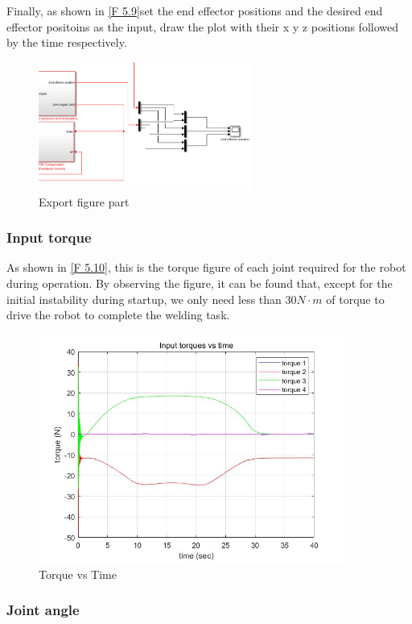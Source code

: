 Finally, as shown in \autoref{F 5.9}set the end effector positions and the desired end effector positoins as the input, draw the plot with their x y z positions followed by the time respectively.

\begin{figure}[htbp]
	\centering
	\includegraphics[width=7cm]{./fig/re.png}
	\caption{Export figure part}
	\label{F 5.9}
\end{figure}


\subsubsection*{Input torque}


As shown in \autoref{F 5.10}, this is the torque figure of each joint required for the robot during operation. By observing the figure, it can be found that, except for the initial instability during startup, we only need less than $30N\cdot m$ of torque to drive the robot to complete the welding task.

\begin{figure}[htbp]
	\centering
	\includegraphics[width=10cm]{./fig/3.jpg}
	\caption{Torque vs Time}
	\label{F 5.10}
\end{figure}

\subsubsection*{Joint angle}




